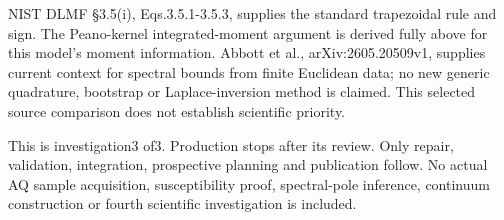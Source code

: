 NIST DLMF §3.5(i), Eqs.3.5.1-3.5.3, supplies the standard trapezoidal rule and sign. The Peano-kernel integrated-moment argument is derived fully above for this model's moment information. Abbott et al., arXiv:2605.20509v1, supplies current context for spectral bounds from finite Euclidean data; no new generic quadrature, bootstrap or Laplace-inversion method is claimed. This selected source comparison does not establish scientific priority.

This is investigation3 of3. Production stops after its review. Only repair, validation, integration, prospective planning and publication follow. No actual AQ sample acquisition, susceptibility proof, spectral-pole inference, continuum construction or fourth scientific investigation is included.

